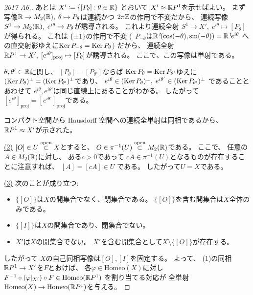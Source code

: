 \documentclass[report]{jlreq}
\begin{document}
\begin{proof}[2017 A6.]
    あとは
    $X' \coloneqq \{ [P_\theta] : \theta \in \mathbb{R} \}$
    とおいて
    $X' \approx \mathbb{R} P^1$を示せばよい。
    まず写像$\mathbb{R} \to M_2(\mathbb{R}), \; \theta \mapsto P_\theta$は連続かつ
    $2\pi\mathbb{Z}$の作用で不変だから、
    連続写像$S^1 \to M_2(\mathbb{R}), \; e^{i\theta} \mapsto P_\theta$が誘導される。
    これより連続全射
    $S^1 \to X', \; e^{i\theta} \mapsto [P_\theta]$
    が得られる。
    これは
    $\{ \pm 1 \}$の作用で不変
    (\because \,
        $P_{-\theta}$は$\mathbb{R} \,{}^{t}\!(\cos(-\theta), \sin(-\theta))
            = \mathbb{R} \,{}^{t}\!e^{i\theta}$
        への直交射影ゆえに$\operatorname{\mathrm{Ker}} P_{-\theta} = \operatorname{\mathrm{Ker}} P_\theta$)
    だから、
    連続全射$\mathbb{R} P^1 \to X', \; [e^{i\theta}]_{\text{proj}} \mapsto [P_\theta]$が誘導される。
    ここで、この写像は単射である。
    \begin{innerproof}
        $\theta, \theta' \in \mathbb{R}$に関し、
        $[P_\theta] = [P_{\theta'}]$ならば
        $\operatorname{\mathrm{Ker}} P_\theta = \operatorname{\mathrm{Ker}} P_{\theta'}$ゆえに
        $(\operatorname{\mathrm{Ker}} P_\theta)^\perp = (\operatorname{\mathrm{Ker}} P_{\theta'})^\perp$であり、
        $e^{i\theta} \in (\operatorname{\mathrm{Ker}} P_\theta)^\perp, \;
            e^{i\theta'} \in (\operatorname{\mathrm{Ker}} P_{\theta'})^\perp$
        であることとあわせて
        $e^{i\theta}, e^{i\theta'}$は同じ直線上にあることがわかる。
        したがって$[e^{i\theta}]_{\text{proj}} = [e^{i\theta'}]_{\text{proj}}$である。
    \end{innerproof}
    コンパクト空間から Hausdorff 空間への連続全単射は同相であるから、
    $\mathbb{R} P^1 \approx X'$が示された。

    \uline{(2)} \quad
    $[O] \in U \stackrel{\text{open}}{\subset} X$とすると、
    $O \in \pi^{-1}(U) \stackrel{\text{open}}{\subset} M_2(\mathbb{R})$である。
    ここで、
    任意の$A \in M_2(\mathbb{R})$に対し、
    ある$c > 0$であって
    $cA \in \pi^{-1}(U)$となるものが存在することに注意すれば、
    $[A] = [cA] \in U$
    である。
    したがって$U = X$である。

    \uline{(3)} \quad
    次のことが成り立つ:
    \begin{itemize}
        \item $\{ [O] \}$は$X$の開集合でなく、閉集合である。
            $\{ [O] \}$を含む開集合は$X$全体のみである。
        \item $\{ [I] \}$は$X$の開集合であり、閉集合でない。
        \item $X'$は$X$の開集合でない。
            $X'$を含む開集合として$X \setminus \{ [O] \}$が存在する。
    \end{itemize}
    したがって
    $X$の自己同相写像は$[O], [I]$を固定する。
    よって、
    (1)の同相$\mathbb{R} P^1 \to X'$を$F$とおけば、
    各$\varphi \in \mathrm{Homeo}(X)$に対し
    $F^{-1} \circ (\varphi|_{X'}) \circ F \in \mathrm{Homeo}(\mathbb{R} P^1)$
    を割り当てる対応が
    全単射$\mathrm{Homeo}(X) \to \mathrm{Homeo}(\mathbb{R} P^1)$を与える。
\end{proof}
\end{document}
